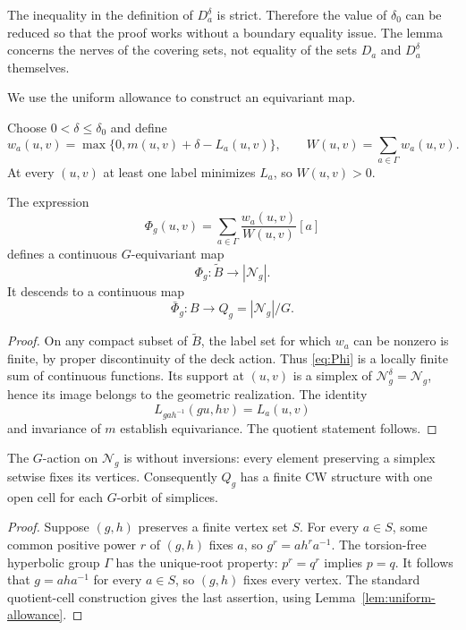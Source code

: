 \begin{remark}
The inequality in the definition of $D_a^\delta$ is strict.
Therefore the value of $\delta_0$ can be reduced so that
the proof works without a boundary equality issue.
The lemma concerns the nerves of the covering sets,
not equality of the sets $D_a$ and $D_a^\delta$ themselves.
\end{remark}

We use the uniform allowance to construct an equivariant map.

Choose $0<\delta\leq\delta_0$ and define
\[
 w_a(u,v)=\max\{0,m(u,v)+\delta-L_a(u,v)\},
 \qquad W(u,v)=\sum_{a\in\Gamma}w_a(u,v).
\]
At every $(u,v)$ at least one label minimizes $L_a$,
so $W(u,v)>0$.

\begin{proposition}\label{prop:Phi}
The expression
\begin{equation}\label{eq:Phi}
 \Phi_g(u,v)=\sum_{a\in\Gamma}
 \frac{w_a(u,v)}{W(u,v)}[a]
\end{equation}
defines a continuous $G$-equivariant map
\[
 \Phi_g:\widetilde B\longrightarrow|\mathcal N_g|.
\]
It descends to a continuous map
\[
 \bar\Phi_g:B\longrightarrow Q_g=|\mathcal N_g|/G.
\]
\end{proposition}

\begin{proof}
On any compact subset of $\widetilde B$, the label set
for which $w_a$ can be nonzero is finite, by proper
discontinuity of the deck action. Thus \eqref{eq:Phi}
is a locally finite sum of continuous functions.
Its support at $(u,v)$ is a simplex of
$\mathcal N_g^\delta=\mathcal N_g$, hence its image
belongs to the geometric realization.
The identity
\[
 L_{gah^{-1}}(gu,hv)=L_a(u,v)
\]
and invariance of $m$ establish equivariance.
The quotient statement follows.
\end{proof}

\begin{lemma}\label{lem:no-inversions}
The $G$-action on $\mathcal N_g$ is without inversions:
every element preserving a simplex setwise fixes its vertices.
Consequently $Q_g$ has a finite CW structure with one
open cell for each $G$-orbit of simplices.
\end{lemma}

\begin{proof}
Suppose $(g,h)$ preserves a finite vertex set $S$.
For every $a\in S$, some common positive power $r$
of $(g,h)$ fixes $a$, so $g^r=ah^ra^{-1}$.
The torsion-free hyperbolic group $\Gamma$ has the
unique-root property: $p^r=q^r$ implies $p=q$.
It follows that $g=aha^{-1}$ for every $a\in S$,
so $(g,h)$ fixes every vertex.
The standard quotient-cell construction gives the
last assertion, using Lemma~\ref{lem:uniform-allowance}.
\end{proof}

